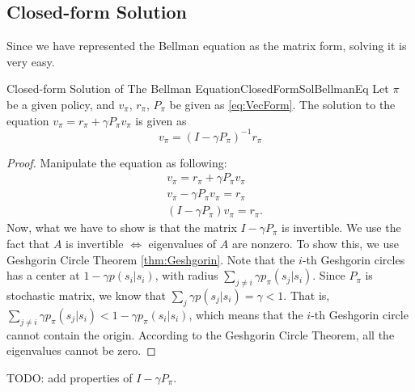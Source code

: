     \subsection{Closed-form Solution}
        Since we have represented the Bellman equation as the matrix form, solving it is very easy.
        \begin{thm}{Closed-form Solution of The Bellman Equation}{ClosedFormSolBellmanEq}
            Let $\pi$ be a given policy, and $v_\pi$, $r_\pi$, $P_\pi$ be given as \ref{eq:VecForm}.
            The solution to the equation $v_\pi = r_\pi + \gamma P_\pi v_\pi$ is given as
            \begin{equation}
                v_\pi = (I-\gamma P_\pi)^{-1}r_\pi
            \end{equation}
        \end{thm}
        \begin{proof}
            Manipulate the equation as following:
            \begin{align}
                &v_\pi = r_\pi + \gamma P_\pi v_\pi \\
                &v_\pi - \gamma P_\pi v_\pi = r_\pi \\
                &(I - \gamma P_\pi)v_\pi = r_\pi.
            \end{align}
            Now, what we have to show is that the matrix $I - \gamma P_\pi$ is invertible.
            We use the fact that $A$ is invertible $\Leftrightarrow$ eigenvalues of $A$ are nonzero.
            To show this, we use Geshgorin Circle Theorem \ref{thm:Geshgorin}. Note that the $i$-th Geshgorin circles has a center at $1-\gamma p(s_i|s_i)$, with
            radius $\sum_{j \neq i}\gamma p_\pi(s_j|s_i)$. Since $P_\pi$ is stochastic matrix, we know that $\sum_{j}\gamma p(s_j|s_i)=\gamma < 1$.
            That is, $\sum_{j \neq i}\gamma p_\pi(s_j|s_i) < 1 - \gamma p_\pi(s_i|s_i)$, which means that the $i$-th Geshgorin circle cannot contain the origin.
            According to the Geshgorin Circle Theorem, all the eigenvalues cannot be zero.
        \end{proof}
        TODO: add properties of $I - \gamma P_\pi$.

